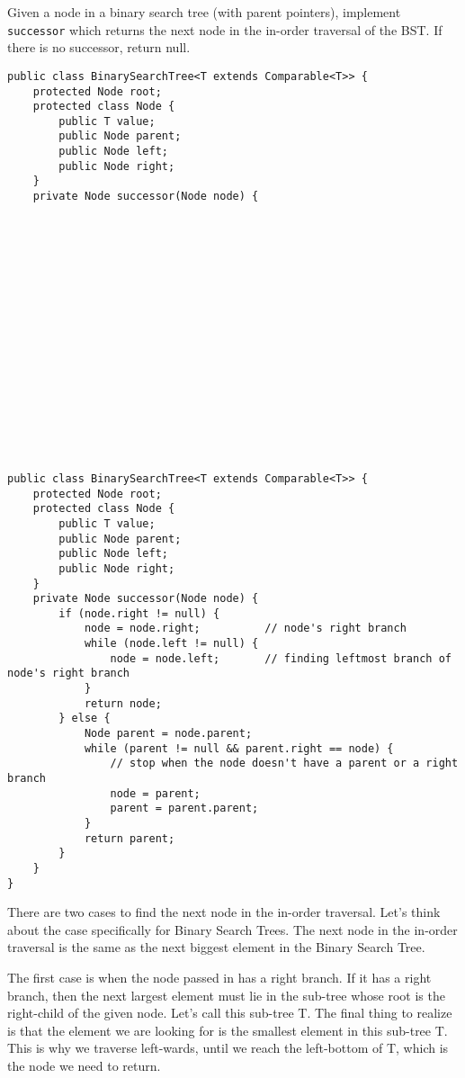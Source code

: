 \begin{blocksection}
\question Given a node in a binary search tree (with parent pointers),
implement \lstinline$successor$ which returns the next node in the in-order
traversal of the BST. If there is no successor, return null.

\ifprintanswers
\else
\begin{lstlisting}
public class BinarySearchTree<T extends Comparable<T>> {
    protected Node root;
    protected class Node {
        public T value;
        public Node parent;
        public Node left;
        public Node right;
    }
    private Node successor(Node node) {


















\end{lstlisting}
\fi

\begin{solution}[2.5in]
\begin{lstlisting}
public class BinarySearchTree<T extends Comparable<T>> {
    protected Node root;
    protected class Node {
        public T value;
        public Node parent;
        public Node left;
        public Node right;
    }
    private Node successor(Node node) {
        if (node.right != null) {
            node = node.right;          // node's right branch
            while (node.left != null) {
                node = node.left;       // finding leftmost branch of node's right branch
            }
            return node;
        } else {
            Node parent = node.parent;
            while (parent != null && parent.right == node) {
                // stop when the node doesn't have a parent or a right branch
                node = parent;
                parent = parent.parent;
            }
            return parent;
        }
    }
}
\end{lstlisting}

There are two cases to find the next node in the in-order traversal. Let's think about the case specifically for Binary Search Trees. The next node in the in-order traversal is the same as the next biggest element in the Binary Search Tree.

The first case is when the node passed in has a right branch. If it has a right branch, then the next largest element must lie in the sub-tree whose root is the right-child of the given node. Let's call this sub-tree T. The final thing to realize is that the element we are looking for is the smallest element in this sub-tree T. This is why we traverse left-wards, until we reach the left-bottom of T, which is the node we need to return.


\end{solution}
\end{blocksection}
